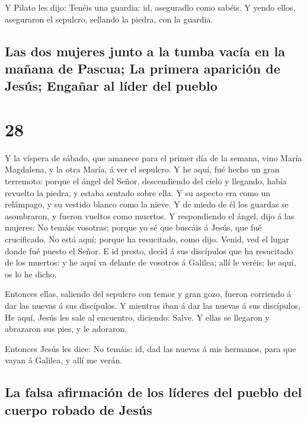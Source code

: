  Y Pilato les dijo: Tenéis una guardia: id, aseguradlo
como sabéis.  Y yendo ellos, aseguraron el sepulcro,
sellando la piedra, con la guardia.

\hypertarget{las-dos-mujeres-junto-a-la-tumba-vacuxeda-en-la-mauxf1ana-de-pascua-la-primera-apariciuxf3n-de-jesuxfas-engauxf1ar-al-luxedder-del-pueblo}{%
\subsection{Las dos mujeres junto a la tumba vacía en la mañana de
Pascua; La primera aparición de Jesús; Engañar al líder del
pueblo}\label{las-dos-mujeres-junto-a-la-tumba-vacuxeda-en-la-mauxf1ana-de-pascua-la-primera-apariciuxf3n-de-jesuxfas-engauxf1ar-al-luxedder-del-pueblo}}

\hypertarget{section-27}{%
\section{28}\label{section-27}}

 Y la víspera de sábado, que amanece para el primer día de
la semana, vino María Magdalena, y la otra María, á ver el sepulcro.
 Y he aquí, fué hecho un gran terremoto: porque el ángel
del Señor, descendiendo del cielo y llegando, había revuelto la piedra,
y estaba sentado sobre ella.  Y su aspecto era como un
relámpago, y su vestido blanco como la nieve.  Y de miedo
de él los guardas se asombraron, y fueron vueltos como muertos.
 Y respondiendo el ángel, dijo á las mujeres: No temáis
vosotras; porque yo sé que buscáis á Jesús, que fué crucificado.
 No está aquí; porque ha resucitado, como dijo. Venid, ved
el lugar donde fué puesto el Señor.  E id presto, decid á
sus discípulos que ha resucitado de los muertos: y he aquí va delante de
vosotros á Galilea; allí le veréis; he aquí, os lo he dicho.

 Entonces ellas, saliendo del sepulcro con temor y gran
gozo, fueron corriendo á dar las nuevas á sus discípulos. Y mientras
iban á dar las nuevas á sus discípulos,  He aquí, Jesús
les sale al encuentro, diciendo: Salve. Y ellas se llegaron y abrazaron
sus pies, y le adoraron.

 Entonces Jesús les dice: No temáis: id, dad las nuevas á
mis hermanos, para que vayan á Galilea, y allí me verán.

\hypertarget{la-falsa-afirmaciuxf3n-de-los-luxedderes-del-pueblo-del-cuerpo-robado-de-jesuxfas}{%
\subsection{La falsa afirmación de los líderes del pueblo del cuerpo
robado de
Jesús}\label{la-falsa-afirmaciuxf3n-de-los-luxedderes-del-pueblo-del-cuerpo-robado-de-jesuxfas}}

